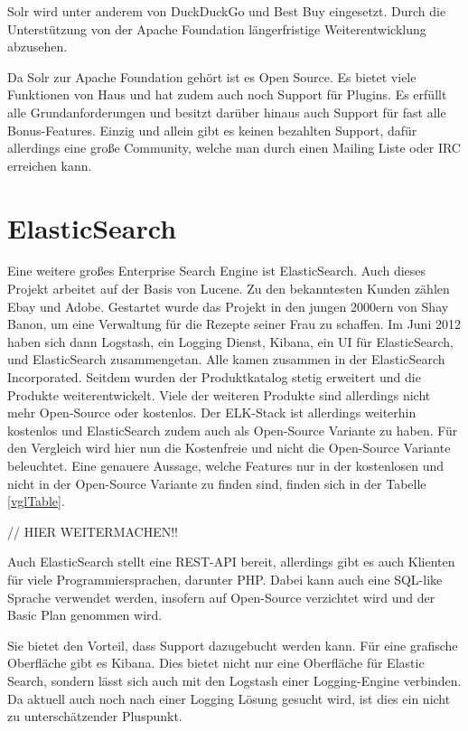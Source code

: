 Solr wird unter anderem von DuckDuckGo und Best Buy eingesetzt. Durch die Unterstützung von der Apache Foundation längerfristige Weiterentwicklung abzusehen. 

Da Solr zur Apache Foundation gehört ist es Open Source. Es bietet viele Funktionen von Haus und hat zudem auch noch Support für Plugins. Es erfüllt alle Grundanforderungen und besitzt darüber hinaus auch Support für fast alle Bonus-Features. Einzig und allein gibt es keinen bezahlten Support, dafür allerdings eine große Community, welche man durch einen Mailing Liste oder IRC erreichen kann.

\cite{TheApacheSoftwareFoundation.2019}

\section{ElasticSearch}

Eine weitere großes Enterprise Search Engine ist ElasticSearch. Auch dieses Projekt arbeitet auf der Basis von Lucene. Zu den bekanntesten Kunden zählen Ebay und Adobe. Gestartet wurde das Projekt in den jungen 2000ern von Shay Banon, um eine Verwaltung für die Rezepte seiner Frau zu schaffen. Im Juni 2012 haben sich dann Logstash, ein Logging Dienst, Kibana, ein UI für ElasticSearch, und ElasticSearch zusammengetan. Alle kamen zusammen in der ElasticSearch Incorporated. Seitdem wurden der Produktkatalog stetig erweitert und die Produkte weiterentwickelt. Viele der weiteren Produkte sind allerdings nicht mehr Open-Source oder kostenlos. Der ELK-Stack ist allerdings weiterhin kostenlos und ElasticSearch zudem auch als Open-Source Variante zu haben. Für den Vergleich wird hier nun die Kostenfreie und nicht die Open-Source Variante beleuchtet. Eine genauere Aussage, welche Features nur in der kostenlosen und nicht in der Open-Source Variante zu finden sind, finden sich in der Tabelle \ref{vglTable}.

// HIER WEITERMACHEN!!

Auch ElasticSearch stellt eine REST-API bereit, allerdings gibt es auch Klienten für viele Programmiersprachen, darunter PHP. Dabei kann auch eine SQL-like Sprache verwendet werden, insofern auf Open-Source verzichtet wird und der Basic Plan genommen wird. \cite{ElasticSearchSub.2019}

Sie bietet den Vorteil, dass Support dazugebucht werden kann. Für eine grafische Oberfläche gibt es Kibana. Dies bietet nicht nur eine Oberfläche für Elastic Search, sondern lässt sich auch mit den Logstash einer Logging-Engine verbinden. Da aktuell auch noch nach einer Logging Lösung gesucht wird, ist dies ein nicht zu unterschätzender Pluspunkt. 

